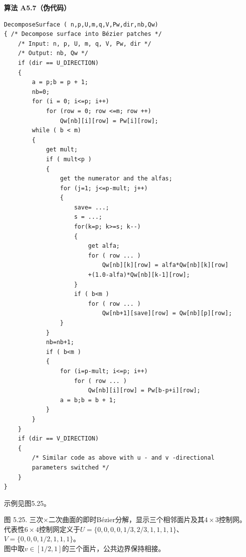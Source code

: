 \documentclass[../main.tex]{subfiles}
\begin{document}
\par\medskip\noindent\textbf{算法 A5.7（伪代码）}\par
\begin{verbatim}
DecomposeSurface ( n,p,U,m,q,V,Pw,dir,nb,Qw)
{ /* Decompose surface into Bézier patches */
    /* Input: n, p, U, m, q, V, Pw, dir */
    /* Output: nb, Qw */
    if (dir == U_DIRECTION)
    {
        a = p;b = p + 1;
        nb=0;
        for (i = 0; i<=p; i++)
            for (row = 0; row <=m; row ++)
                Qw[nb][i][row] = Pw[i][row];
        while ( b < m)
        {
            get mult;
            if ( mult<p )
            {
                get the numerator and the alfas;
                for (j=1; j<=p-mult; j++)
                {
                    save= ...;
                    s = ...;
                    for(k=p; k>=s; k--)
                    {
                        get alfa;
                        for ( row ... )
                            Qw[nb][k][row] = alfa*Qw[nb][k][row]
                        +(1.0-alfa)*Qw[nb][k-1][row];
                    }
                    if ( b<m )
                        for ( row ... )
                            Qw[nb+1][save][row] = Qw[nb][p][row];
                }
            }
            nb=nb+1;
            if ( b<m )
            {
                for (i=p-mult; i<=p; i++)
                    for ( row ... )
                        Qw[nb][i][row] = Pw[b-p+i][row];
                a = b;b = b + 1;
            }
        }
    }
    if (dir == V_DIRECTION)
    {
        /* Similar code as above with u - and v -directional
        parameters switched */
    }
}
\end{verbatim}



示例见图5.25。

\begin{center}
\begin{minipage}{20cm}
\vspace*{.6\baselineskip}
\centering
{}
\par\smallskip
图 5.25. 三次$\times$二次曲面的即时Bézier分解，显示三个相邻面片及其$4\times3$控制网。\\
代表性$6\times4$控制网定义于$U=\{0,0,0,0,1/3,2/3,1,1,1,1\}$、$V=\{0,0,0,1/2,1,1,1\}$。\\
图中取$v\in[1/2,1]$的三个面片，公共边界保持相接。
\end{minipage}
\end{center}
\end{document}
